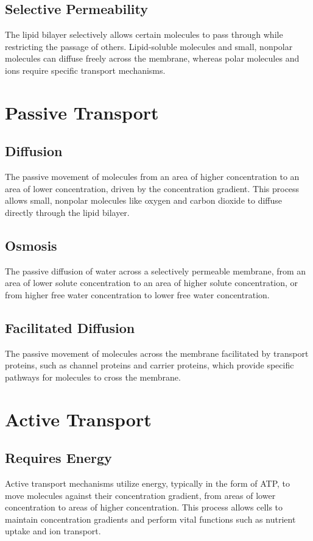 \documentclass{article}
\begin{document}
\subsection{Selective Permeability}
The lipid bilayer selectively allows certain molecules to pass through while restricting the passage of others. Lipid-soluble molecules and small, nonpolar molecules can diffuse freely across the membrane, whereas polar molecules and ions require specific transport mechanisms.

\section*{Passive Transport}

\subsection{Diffusion}
The passive movement of molecules from an area of higher concentration to an area of lower concentration, driven by the concentration gradient. This process allows small, nonpolar molecules like oxygen and carbon dioxide to diffuse directly through the lipid bilayer.

\subsection{Osmosis}
The passive diffusion of water across a selectively permeable membrane, from an area of lower solute concentration to an area of higher solute concentration, or from higher free water concentration to lower free water concentration.

\subsection{Facilitated Diffusion}
The passive movement of molecules across the membrane facilitated by transport proteins, such as channel proteins and carrier proteins, which provide specific pathways for molecules to cross the membrane.

\section*{Active Transport}

\subsection{Requires Energy}
Active transport mechanisms utilize energy, typically in the form of ATP, to move molecules against their concentration gradient, from areas of lower concentration to areas of higher concentration. This process allows cells to maintain concentration gradients and perform vital functions such as nutrient uptake and ion transport.
\end{document}
